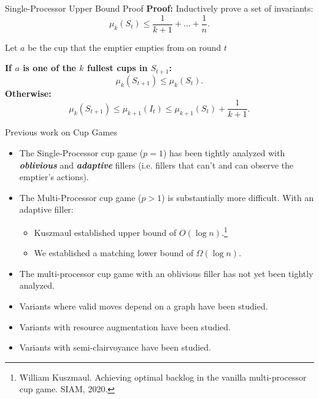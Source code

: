 \documentclass[xcolor=x11names, svgnames, rgb]{beamer}
\newcommand{\defn}[1]       {{\textit{\textbf{\boldmath #1}}}}
\begin{document}
\begin{frame}[t]{Single-Processor Upper Bound Proof}
  \textbf{Proof:}
  Inductively prove a set of invariants: 
    $$\mu_k(S_t) \le \frac{1}{k+1} + \ldots +\frac{1}{n}.$$

  \vspace{0.25cm}
  Let $a$ be the cup that the emptier empties from on round $t$

  \vspace{0.25cm}
  \textbf{If $a$ is one of the $k$ fullest cups in $S_{t+1}$:}
  $$\mu_k(S_{t+1}) \le \mu_k(S_t).$$
  \textbf{Otherwise:}
  $$\mu_k(S_{t+1}) \le \mu_{k+1}(I_t) \le \mu_{k+1}(S_{t}) + \frac{1}{k+1}.$$
\end{frame}

\begin{frame}[t]{Previous work on Cup Games}
  \begin{itemize}
    \item The Single-Processor cup game ($p=1$) has been tightly analyzed with \defn{oblivious} and \defn{adaptive} fillers (i.e. fillers that can't and can observe the emptier's actions).
    \item The Multi-Processor cup game ($p>1$) is substantially more difficult. With an adaptive filler:
      \begin{itemize}
        \item Kuszmaul established upper bound of $O(\log n)$.\footnote{\tiny\color{blue}William Kuszmaul. Achieving optimal backlog in the vanilla multi-processor cup game. SIAM, 2020.}
        \item We established a matching lower bound of $\Omega(\log n)$.
      \end{itemize}
    \item The multi-processor cup game with an oblivious filler has not yet
      been tightly analyzed.
    \item Variants where valid moves depend on a graph have been studied.
    \item Variants with resource augmentation have been studied.
    \item Variants with semi-clairvoyance have been studied.
  \end{itemize}
\end{frame}
\end{document}

